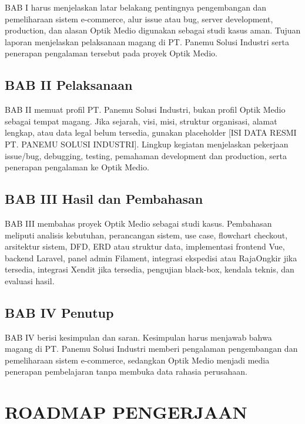 \documentclass[12pt,a4paper]{report}
\begin{document}
BAB I harus menjelaskan latar belakang pentingnya pengembangan dan pemeliharaan sistem e-commerce, alur issue atau bug, server development, production, dan alasan Optik Medio digunakan sebagai studi kasus aman. Tujuan laporan menjelaskan pelaksanaan magang di PT. Panemu Solusi Industri serta penerapan pengalaman tersebut pada proyek Optik Medio.

\section{BAB II Pelaksanaan}

BAB II memuat profil PT. Panemu Solusi Industri, bukan profil Optik Medio sebagai tempat magang. Jika sejarah, visi, misi, struktur organisasi, alamat lengkap, atau data legal belum tersedia, gunakan placeholder [ISI DATA RESMI PT. PANEMU SOLUSI INDUSTRI]. Lingkup kegiatan menjelaskan pekerjaan issue/bug, debugging, testing, pemahaman development dan production, serta penerapan pengalaman ke Optik Medio.

\section{BAB III Hasil dan Pembahasan}

BAB III membahas proyek Optik Medio sebagai studi kasus. Pembahasan meliputi analisis kebutuhan, perancangan sistem, use case, flowchart checkout, arsitektur sistem, DFD, ERD atau struktur data, implementasi frontend Vue, backend Laravel, panel admin Filament, integrasi ekspedisi atau RajaOngkir jika tersedia, integrasi Xendit jika tersedia, pengujian black-box, kendala teknis, dan evaluasi hasil.

\section{BAB IV Penutup}

BAB IV berisi kesimpulan dan saran. Kesimpulan harus menjawab bahwa magang di PT. Panemu Solusi Industri memberi pengalaman pengembangan dan pemeliharaan sistem e-commerce, sedangkan Optik Medio menjadi media penerapan pembelajaran tanpa membuka data rahasia perusahaan.

\chapter{ROADMAP PENGERJAAN}
\end{document}
